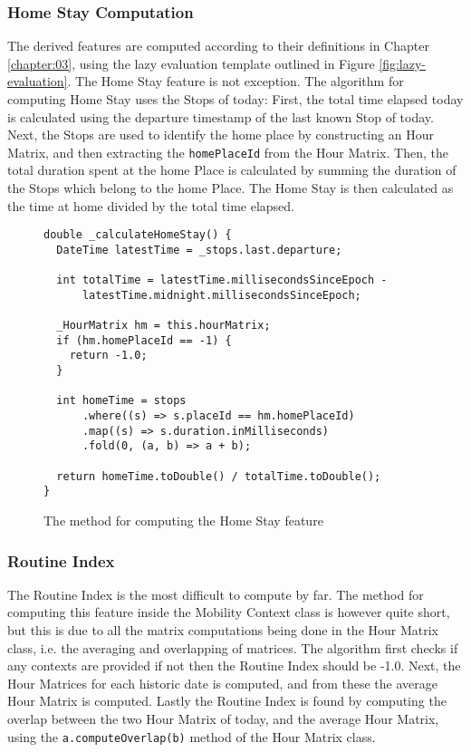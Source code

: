\subsubsection{Home Stay Computation}
The derived features are computed according to their definitions in Chapter \ref{chapter:03}, using the lazy evaluation template outlined in Figure \ref{fig:lazy-evaluation}. The Home Stay feature is not exception. The algorithm for computing Home Stay uses the Stops of today: First, the total time elapsed today is calculated using the departure timestamp of the last known Stop of today. Next, the Stops are used to identify the home place by constructing an Hour Matrix, and then extracting the \verb|homePlaceId| from the Hour Matrix. Then, the total duration spent at the home Place is calculated by summing the duration of the Stops which belong to the home Place. The Home Stay is then calculated as the time at home divided by the total time elapsed.

\begin{figure}
    \centering
\begin{verbatim}
double _calculateHomeStay() {
  DateTime latestTime = _stops.last.departure;

  int totalTime = latestTime.millisecondsSinceEpoch -
      latestTime.midnight.millisecondsSinceEpoch;

  _HourMatrix hm = this.hourMatrix;
  if (hm.homePlaceId == -1) {
    return -1.0;
  }

  int homeTime = stops
      .where((s) => s.placeId == hm.homePlaceId)
      .map((s) => s.duration.inMilliseconds)
      .fold(0, (a, b) => a + b);

  return homeTime.toDouble() / totalTime.toDouble();
}
\end{verbatim}
    \caption{The method for computing the Home Stay feature}
    \label{fig:home-stay-code}
\end{figure}

\subsubsection{Routine Index}
The Routine Index is the most difficult to compute by far. The method for computing this feature inside the Mobility Context class is however quite short, but this is due to all the matrix computations being done in the Hour Matrix class, i.e. the averaging and overlapping of matrices. The algorithm first checks if any contexts are provided if not then the Routine Index should be -1.0. Next, the Hour Matrices for each historic date is computed, and from these the average Hour Matrix is computed. Lastly the Routine Index is found by computing the overlap between the two Hour Matrix of today, and the average Hour Matrix, using the \verb|a.computeOverlap(b)| method of the Hour Matrix class.

